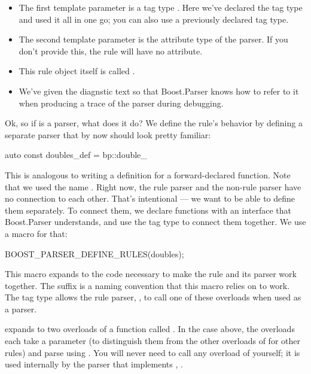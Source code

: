 \documentclass{MyBook}
\begin{document}
\begin{itemize}
\item
  The first template parameter is a tag type . Here we've declared the tag type and used it all in one go; you can also use a previously declared tag type.
\item
  The second template parameter is the attribute type of the parser. If you don't provide this, the rule will have no attribute.
\item
  This rule object itself is called .
\item
  We've given  the diagnstic text  so that Boost.Parser knows how to refer to it when producing a trace of the parser during debugging.
\end{itemize}

Ok, so if  is a parser, what does it do? We define the rule's behavior by defining a separate parser that by now should look pretty familiar:

\begin{code}
auto const doubles_def = bp::double_ %
\end{code}

This is analogous to writing a definition for a forward-declared function. Note that we used the name . Right now, the  rule parser and the  non-rule parser have no connection to each other. That's intentional --- we want to be able to define them separately. To connect them, we declare functions with an interface that Boost.Parser understands, and use the tag type  to connect them together. We use a macro for that:

\begin{code}
BOOST_PARSER_DEFINE_RULES(doubles);
\end{code}

This macro expands to the code necessary to make the rule  and its parser  work together. The  suffix is a naming convention that this macro relies on to work. The tag type allows the rule parser, , to call one of these overloads when used as a parser.

 expands to two overloads of a function called . In the case above, the overloads each take a  parameter (to distinguish them from the other overloads of  for other rules) and parse using . You will never need to call any overload of  yourself; it is used internally by the parser that implements , .
\end{document}
